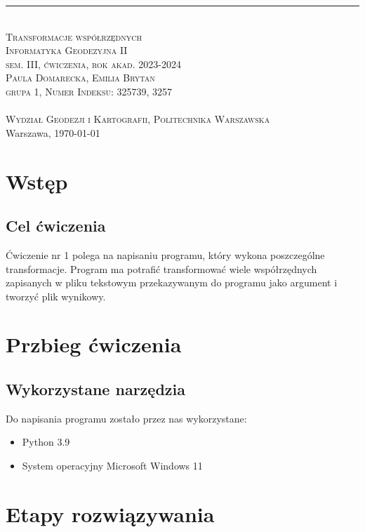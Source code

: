 \documentclass[10pt,a4paper]{article}
\newcommand{\authorName}{Paula Domarecka, Emilia Brytan \\ grupa 1, Numer Indeksu: 325739, 3257}
\newcommand{\titeReport}{Transformacje współrzędnych} %
\newcommand{\titleLecture}{Informatyka Geodezyjna II \\ sem. III, ćwiczenia, rok akad. 2023-2024} %
\newcommand{\faculty}{Wydział Geodezji i Kartografii}
\newcommand{\university}{Politechnika Warszawska}
\newcommand{\city}{Warszawa}
\begin{document}
		\rule{\textwidth}{.5pt} \\
		\vspace{1.0cm}
		\Large \textsc{\titeReport}
		\vspace{0.5cm} \\  
		\large \textsc{\titleLecture}
		\vspace{0.5cm}\\
		\textsc{\authorName}  \\
		\mymail \\
		\textsc{\faculty}, \textsc{\university}  \\ 
		\city, \today
	
	\tableofcontents
	\newpage
\section{Wstęp}
\subsection{Cel ćwiczenia}
Ćwiczenie nr 1 polega na napisaniu programu, który wykona poszczególne transformacje. Program ma potrafić transformować wiele współrzędnych zapisanych w pliku tekstowym przekazywanym do programu jako argument i tworzyć plik wynikowy. 
\section{Przbieg ćwiczenia}
\subsection{Wykorzystane narzędzia}
Do napisania programu zostało przez nas wykorzystane:
\begin{itemize}
	\item Python 3.9
	\item System operacyjny Microsoft Windows 11
\end{itemize}


\section{Etapy rozwiązywania}
\end{document}
